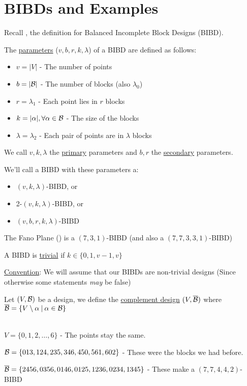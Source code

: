 \section{BIBDs and Examples}

Recall , the definition for Balanced Incomplete Block Designs (BIBD).

The \ul{parameters} ($v, b, r, k, \lambda$) of a BIBD are defined as follows:
\begin{itemize}
    \item $v = |V|$ - The number of points
    \item $b = |\mathcal{B}|$ - The number of blocks (also $\lambda_0$)
    \item $r = \lambda_1$ - Each point lies in $r$ blocks
    \item $k = |\alpha|, \forall \alpha \in \mathcal{B}$ - The size of the blocks
    \item $\lambda = \lambda_2$ - Each pair of points are in $\lambda$ blocks
\end{itemize}

We call $v, k, \lambda$ the \ul{primary} parameters and $b, r$ the \ul{secondary} parameters.

We'll call a BIBD with these parameters a:
\begin{itemize}
    \item $(v, k, \lambda)$-BIBD, or
    \item 2-$(v, k, \lambda)$-BIBD, or
    \item $(v, b, r, k, \lambda)$-BIBD
\end{itemize}

\begin{example}
    The Fano Plane () is a $(7,3,1)$-BIBD (and also a $(7,7,3,3,1)$-BIBD)
\end{example}

A BIBD is \ul{trivial} if $k \in \{0, 1, v-1, v\}$

\ul{Convention}: We will assume that our BIBDs are non-trivial designs (Since otherwise some statements \textit{may} be false)

\begin{definition}
    Let $(V, \mathcal{B})$ be a design, we define the \ul{complement design} $(V, \overline{\mathcal{B}})$ where $\overline{\mathcal{B}} = \{V \setminus \alpha \:|\: \alpha \in \mathcal{B} \}$ 
\end{definition}

\begin{example}
    ~\\
    $V = \{0, 1, 2, \ldots, 6\}$ - The points stay the same.

    $\mathcal{B} = \{013, 124, 235, 346, 450, 561, 602 \}$ - These were the blocks we had before.

    $\overline{\mathcal{B}} = \{2456, 0356, 0146, 0125, 1236, 0234, 1345 \}$ - These make a $(7, 7, 4, 4, 2)$-BIBD
\end{example}

